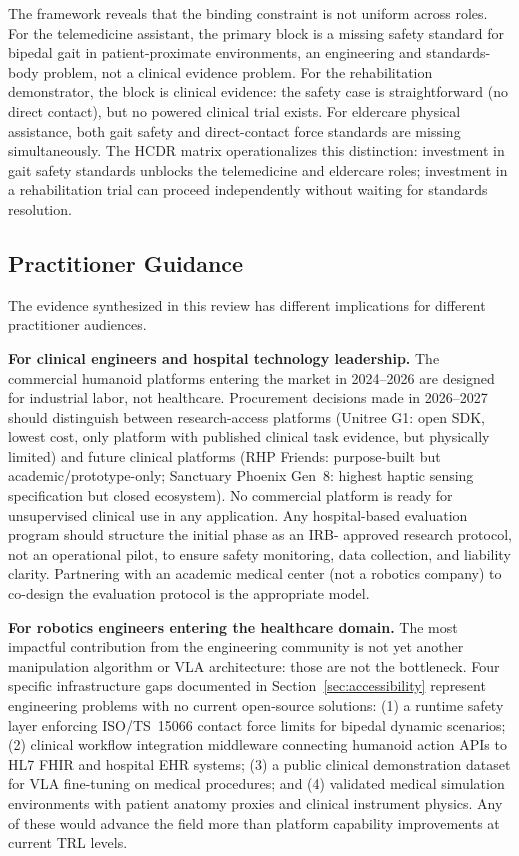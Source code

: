 \documentclass[acmjour]{acmart}
\begin{document}
The framework reveals that the binding constraint is not uniform across roles.
For the telemedicine assistant, the primary block is a missing safety standard for
bipedal gait in patient-proximate environments, an engineering and standards-body
problem, not a clinical evidence problem. For the rehabilitation demonstrator, the
block is clinical evidence: the safety case is straightforward (no direct contact),
but no powered clinical trial exists. For eldercare physical assistance, both gait
safety and direct-contact force standards are missing simultaneously. The HCDR
matrix operationalizes this distinction: investment in gait safety standards
unblocks the telemedicine and eldercare roles; investment in a rehabilitation
trial can proceed independently without waiting for standards resolution.

\subsection{Practitioner Guidance}
\label{sec:practitioners}

The evidence synthesized in this review has different implications for different
practitioner audiences.

\textbf{For clinical engineers and hospital technology leadership.} The commercial
humanoid platforms entering the market in 2024--2026 are designed for industrial
labor, not healthcare. Procurement decisions made in 2026--2027 should distinguish
between research-access platforms (Unitree G1: open SDK, lowest cost, only
platform with published clinical task evidence, but physically limited) and future
clinical platforms (RHP Friends: purpose-built but academic/prototype-only; Sanctuary
Phoenix Gen~8: highest haptic sensing specification but closed ecosystem). No
commercial platform is ready for unsupervised clinical use in any application.
Any hospital-based evaluation program should structure the initial phase as an IRB-
approved research protocol, not an operational pilot, to ensure safety monitoring,
data collection, and liability clarity. Partnering with an academic medical center
(not a robotics company) to co-design the evaluation protocol is the appropriate
model.

\textbf{For robotics engineers entering the healthcare domain.} The most impactful
contribution from the engineering community is not yet another manipulation
algorithm or VLA architecture: those are not the bottleneck. Four specific
infrastructure gaps documented in Section~\ref{sec:accessibility} represent
engineering problems with no current open-source solutions: (1) a runtime safety
layer enforcing ISO/TS~15066 contact force limits for bipedal dynamic scenarios;
(2) clinical workflow integration middleware connecting humanoid action APIs to
HL7 FHIR and hospital EHR systems; (3) a public clinical demonstration dataset
for VLA fine-tuning on medical procedures; and (4) validated medical simulation
environments with patient anatomy proxies and clinical instrument physics. Any
of these would advance the field more than platform capability
improvements at current TRL levels.
\end{document}
